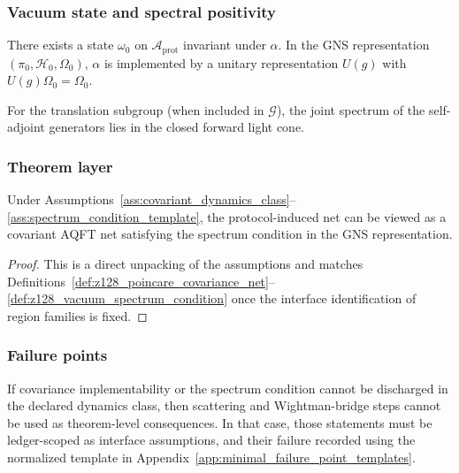 \subsubsection{Vacuum state and spectral positivity}
\begin{assumption}
\label{ass:vacuum_state_implementability}
There exists a state $\omega_0$ on $\mathcal{A}_{\mathrm{prot}}$ invariant under $\alpha$.
In the GNS representation $(\pi_0,\mathcal{H}_0,\Omega_0)$, $\alpha$ is implemented by a unitary representation $U(g)$ with $U(g)\Omega_0=\Omega_0$.
\end{assumption}

\begin{assumption}
\label{ass:spectrum_condition_template}
For the translation subgroup (when included in $\mathcal{G}$), the joint spectrum of the self-adjoint generators lies in the closed forward light cone.
\end{assumption}

\subsubsection{Theorem layer}
\begin{theorem}
\label{thm:covariance_spectrum_conditional}
\MathTag Under Assumptions~\ref{ass:covariant_dynamics_class}--\ref{ass:spectrum_condition_template}, the protocol-induced net can be viewed as a covariant AQFT net satisfying the spectrum condition in the GNS representation.
\end{theorem}
\begin{proof}
This is a direct unpacking of the assumptions and matches Definitions~\ref{def:z128_poincare_covariance_net}--\ref{def:z128_vacuum_spectrum_condition} once the interface identification of region families is fixed.
\end{proof}

\subsubsection{Failure points}
\AuditTag If covariance implementability or the spectrum condition cannot be discharged in the declared dynamics class, then scattering and Wightman-bridge steps cannot be used as theorem-level consequences.
In that case, those statements must be ledger-scoped as interface assumptions, and their failure recorded using the normalized template in Appendix~\ref{app:minimal_failure_point_templates}.

